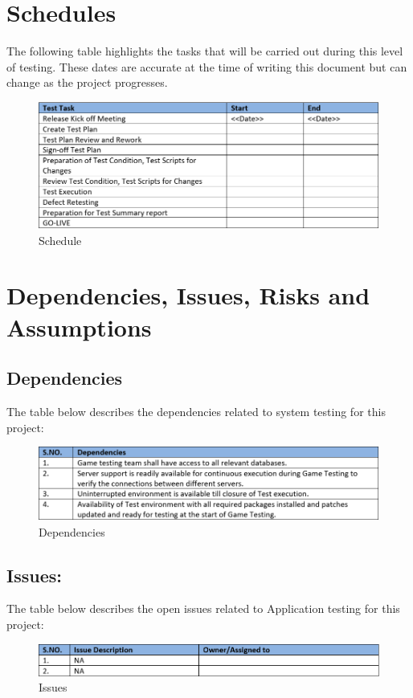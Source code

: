 \documentclass{article}
\begin{document}
\newpage

\section{Schedules}
The following table highlights the tasks that will be carried out during this level of testing. These dates are accurate at the time of writing this document but can change as the project progresses.
\begin{figure}[h]
    \centering
    \includegraphics[scale=0.9]{./images/Schedule.PNG}
    \caption{Schedule}
    \label{fig:my_label}
\end{figure}

\newpage

\section{Dependencies, Issues, Risks and Assumptions}
\subsection{Dependencies}
The table below describes the dependencies related to system testing for this project:
\begin{figure}[h]
    \centering
    \includegraphics[scale=0.9]{./images/Dependencies.PNG}
    \caption{Dependencies}
    \label{fig:my_label}
\end{figure}
\subsection{Issues:}
The table below describes the open issues related to Application testing for this project:
\begin{figure}[h]
    \centering
    \includegraphics[scale=0.9]{./images/Issues.PNG}
    \caption{Issues}
    \label{fig:my_label}
\end{figure}
\end{document}
